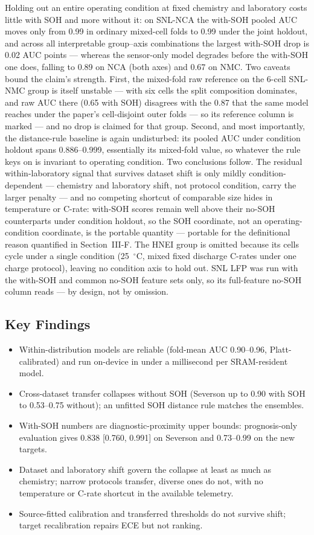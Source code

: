\documentclass[preprint,12pt]{elsarticle}
\begin{document}
Holding out an entire operating condition at fixed chemistry and laboratory costs little with SOH and more without it: on SNL-NCA the with-SOH pooled AUC moves only from 0.99 in ordinary mixed-cell folds to 0.99 under the joint holdout, and across all interpretable group--axis combinations the largest with-SOH drop is 0.02 AUC points --- whereas the sensor-only model degrades before the with-SOH one does, falling to 0.89 on NCA (both axes) and 0.67 on NMC. Two caveats bound the claim's strength. First, the mixed-fold raw reference on the 6-cell SNL-NMC group is itself unstable --- with six cells the split composition dominates, and raw AUC there (0.65 with SOH) disagrees with the 0.87 that the same model reaches under the paper's cell-disjoint outer folds --- so its reference column is marked --- and no drop is claimed for that group. Second, and most importantly, the distance-rule baseline is again undisturbed: its pooled AUC under condition holdout spans 0.886--0.999, essentially its mixed-fold value, so whatever the rule keys on is invariant to operating condition. Two conclusions follow. The residual within-laboratory signal that survives dataset shift is only mildly condition-dependent --- chemistry and laboratory shift, not protocol condition, carry the larger penalty --- and no competing shortcut of comparable size hides in temperature or C-rate: with-SOH scores remain well above their no-SOH counterparts under condition holdout, so the SOH coordinate, not an operating-condition coordinate, is the portable quantity --- portable for the definitional reason quantified in Section~III-F. The HNEI group is omitted because its cells cycle under a single condition (25~$^\circ$C, mixed fixed discharge C-rates under one charge protocol), leaving no condition axis to hold out. SNL LFP was run with the with-SOH and common no-SOH feature sets only, so its full-feature no-SOH column reads --- by design, not by omission.

\subsection{Key Findings}
\begin{itemize}
\item Within-distribution models are reliable (fold-mean AUC 0.90--0.96, Platt-calibrated) and run on-device in under a millisecond per SRAM-resident model.
\item Cross-dataset transfer collapses without SOH (Severson up to 0.90 with SOH to 0.53--0.75 without); an unfitted SOH distance rule matches the ensembles.
\item With-SOH numbers are diagnostic-proximity upper bounds: prognosis-only evaluation gives 0.838 [0.760, 0.991] on Severson and 0.73--0.99 on the new targets.
\item Dataset and laboratory shift govern the collapse at least as much as chemistry; narrow protocols transfer, diverse ones do not, with no temperature or C-rate shortcut in the available telemetry.
\item Source-fitted calibration and transferred thresholds do not survive shift; target recalibration repairs ECE but not ranking.
\end{itemize}
\end{document}
